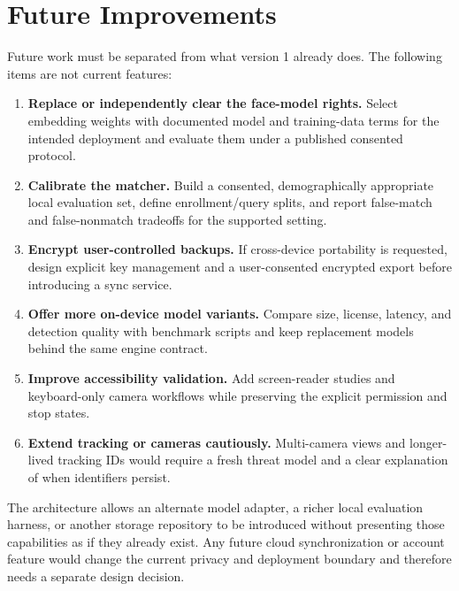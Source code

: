 \documentclass[11pt,oneside,openany]{report}
\begin{document}
\chapter{Future Improvements}
Future work must be separated from what version 1 already does. The following items are not current features:
\begin{enumerate}
  \item \textbf{Replace or independently clear the face-model rights.} Select embedding weights with documented model and training-data terms for the intended deployment and evaluate them under a published consented protocol.
  \item \textbf{Calibrate the matcher.} Build a consented, demographically appropriate local evaluation set, define enrollment/query splits, and report false-match and false-nonmatch tradeoffs for the supported setting.
  \item \textbf{Encrypt user-controlled backups.} If cross-device portability is requested, design explicit key management and a user-consented encrypted export before introducing a sync service.
  \item \textbf{Offer more on-device model variants.} Compare size, license, latency, and detection quality with benchmark scripts and keep replacement models behind the same engine contract.
  \item \textbf{Improve accessibility validation.} Add screen-reader studies and keyboard-only camera workflows while preserving the explicit permission and stop states.
  \item \textbf{Extend tracking or cameras cautiously.} Multi-camera views and longer-lived tracking IDs would require a fresh threat model and a clear explanation of when identifiers persist.
\end{enumerate}

The architecture allows an alternate model adapter, a richer local evaluation harness, or another storage repository to be introduced without presenting those capabilities as if they already exist. Any future cloud synchronization or account feature would change the current privacy and deployment boundary and therefore needs a separate design decision.

\appendix
\end{document}
